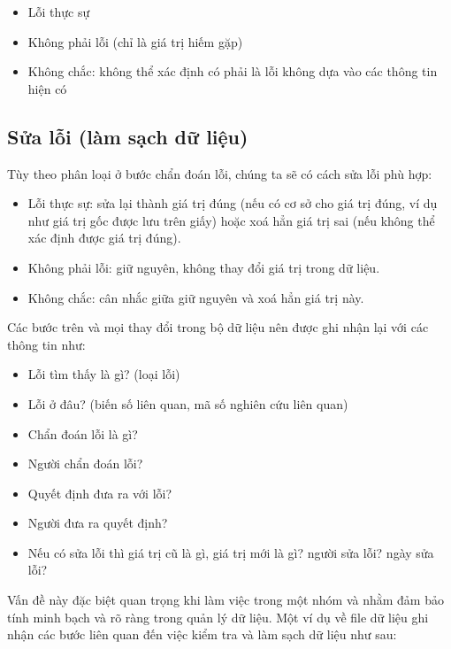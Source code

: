 \documentclass[]{tufte-book}
\providecommand{\tightlist}{%
  \setlength{\itemsep}{0pt}\setlength{\parskip}{0pt}}
\begin{document}
\begin{itemize}
\tightlist
\item
  Lỗi thực sự
\item
  Không phải lỗi (chỉ là giá trị hiếm gặp)
\item
  Không chắc: không thể xác định có phải là lỗi không dựa vào các thông tin hiện có
\end{itemize}

\hypertarget{sa-li-lam-sach-d-liu}{%
\subsection{Sửa lỗi (làm sạch dữ liệu)}\label{sa-li-lam-sach-d-liu}}

Tùy theo phân loại ở bước chẩn đoán lỗi, chúng ta sẽ có cách sửa lỗi phù hợp:

\begin{itemize}
\tightlist
\item
  Lỗi thực sự: sửa lại thành giá trị đúng (nếu có cơ sở cho giá trị đúng, ví dụ như giá trị gốc được lưu trên giấy) hoặc xoá hẳn giá trị sai (nếu không thể xác định được giá trị đúng).
\item
  Không phải lỗi: giữ nguyên, không thay đổi giá trị trong dữ liệu.
\item
  Không chắc: cân nhắc giữa giữ nguyên và xoá hẳn giá trị này.
\end{itemize}

Các bước trên và mọi thay đổi trong bộ dữ liệu nên được ghi nhận lại với các thông tin như:

\begin{itemize}
\tightlist
\item
  Lỗi tìm thấy là gì? (loại lỗi)
\item
  Lỗi ở đâu? (biến số liên quan, mã số nghiên cứu liên quan)
\item
  Chẩn đoán lỗi là gì?
\item
  Người chẩn đoán lỗi?
\item
  Quyết định đưa ra với lỗi?
\item
  Người đưa ra quyết định?
\item
  Nếu có sửa lỗi thì giá trị cũ là gì, giá trị mới là gì? người sửa lỗi? ngày sửa lỗi?
\end{itemize}

Vấn đề này đặc biệt quan trọng khi làm việc trong một nhóm và nhằm đảm bảo tính minh bạch và rõ ràng trong quản lý dữ liệu. Một ví dụ về file dữ liệu ghi nhận các bước liên quan đến việc kiểm tra và làm sạch dữ liệu như sau:
\end{document}
